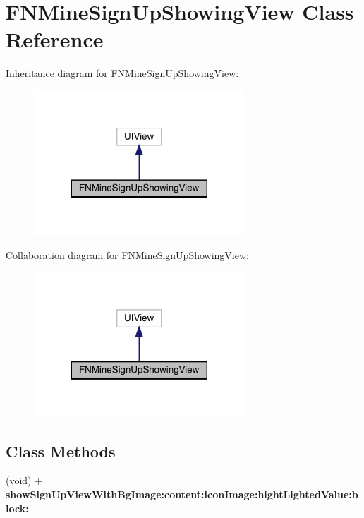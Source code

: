 \hypertarget{interface_f_n_mine_sign_up_showing_view}{}\section{F\+N\+Mine\+Sign\+Up\+Showing\+View Class Reference}
\label{interface_f_n_mine_sign_up_showing_view}


Inheritance diagram for F\+N\+Mine\+Sign\+Up\+Showing\+View\+:\nopagebreak
\begin{figure}[H]
\begin{center}
\leavevmode
\includegraphics[width=224pt]{interface_f_n_mine_sign_up_showing_view__inherit__graph}
\end{center}
\end{figure}


Collaboration diagram for F\+N\+Mine\+Sign\+Up\+Showing\+View\+:\nopagebreak
\begin{figure}[H]
\begin{center}
\leavevmode
\includegraphics[width=224pt]{interface_f_n_mine_sign_up_showing_view__coll__graph}
\end{center}
\end{figure}
\subsection*{Class Methods}
\begin{DoxyCompactItemize}
\item 
\mbox{\label{interface_f_n_mine_sign_up_showing_view_a5a100300d0e02049931e2bc7f61b9dd9}} 
(void) + {\bfseries show\+Sign\+Up\+View\+With\+Bg\+Image\+:content\+:icon\+Image\+:hight\+Lighted\+Value\+:block\+:}
\end{DoxyCompactItemize}
